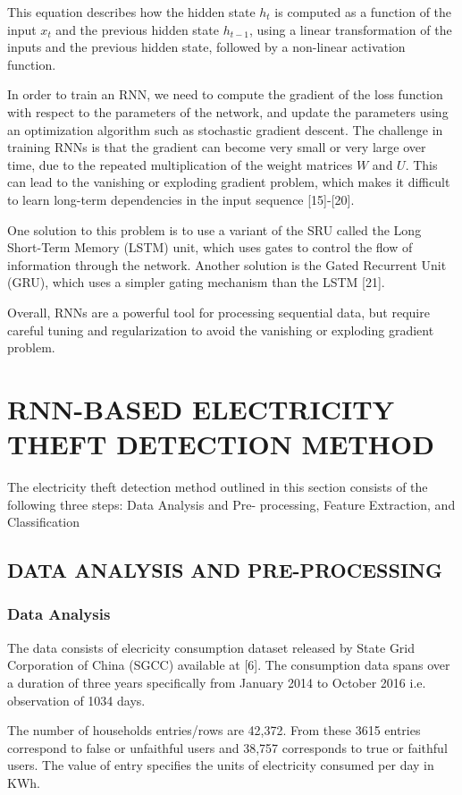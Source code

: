 \documentclass{ieeeaccess}
\begin{document}
This equation describes how the hidden state \(h_t\) is computed as a function of the input \(x_t\) and the previous hidden state \(h_{t-1}\), using a linear transformation of the inputs and the previous hidden state, followed by a non-linear activation function.

In order to train an RNN, we need to compute the gradient of the loss function with respect to the parameters of the network, and update the parameters using an optimization algorithm such as stochastic gradient descent. The challenge in training RNNs is that the gradient can become very small or very large over time, due to the repeated multiplication of the weight matrices \(W\) and \(U\). This can lead to the vanishing or exploding gradient problem, which makes it difficult to learn long-term dependencies in the input sequence [15]-[20].

One solution to this problem is to use a variant of the SRU called the Long Short-Term Memory (LSTM) unit, which uses gates to control the flow of information through the network. Another solution is the Gated Recurrent Unit (GRU), which uses a simpler gating mechanism than the LSTM [21].

Overall, RNNs are a powerful tool for processing sequential data, but require careful tuning and regularization to avoid the vanishing or exploding gradient problem.


\section{RNN-BASED ELECTRICITY THEFT DETECTION METHOD}
The electricity theft detection method outlined in this section consists of the following three steps: Data Analysis and Pre- processing, Feature Extraction, and Classification
\label{sec:guidelines}

\subsection{DATA ANALYSIS AND PRE-PROCESSING}
\subsubsection{Data Analysis}
{The data consists of elecricity consumption dataset released by State Grid Corporation of China (SGCC) available at [6]. The consumption data spans over a duration of three years specifically from January 2014 to October  2016 i.e. observation of 1034 days.}


The number of households entries/rows are 42,372. From these 3615 entries correspond to false or unfaithful users and 38,757 corresponds to true or faithful users. The value of entry specifies the units of electricity consumed per day in KWh. 
\end{document}
